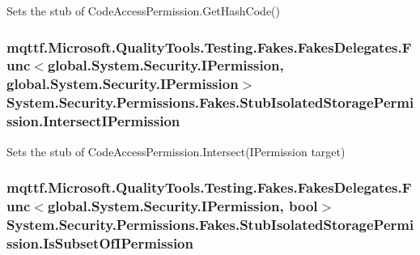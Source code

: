 Sets the stub of Code\-Access\-Permission.\-Get\-Hash\-Code()

\hypertarget{class_system_1_1_security_1_1_permissions_1_1_fakes_1_1_stub_isolated_storage_permission_a2d61c76240be9920724f92a256a30592}{
\subsubsection[{Intersect\-I\-Permission}]{\setlength{\rightskip}{0pt plus 5cm}mqttf.\-Microsoft.\-Quality\-Tools.\-Testing.\-Fakes.\-Fakes\-Delegates.\-Func$<$global.\-System.\-Security.\-I\-Permission, global.\-System.\-Security.\-I\-Permission$>$ System.\-Security.\-Permissions.\-Fakes.\-Stub\-Isolated\-Storage\-Permission.\-Intersect\-I\-Permission}}\label{class_system_1_1_security_1_1_permissions_1_1_fakes_1_1_stub_isolated_storage_permission_a2d61c76240be9920724f92a256a30592}


Sets the stub of Code\-Access\-Permission.\-Intersect(\-I\-Permission target)

\hypertarget{class_system_1_1_security_1_1_permissions_1_1_fakes_1_1_stub_isolated_storage_permission_a1bf5c6126563585f43c49fd7ae0e5b4e}{
\subsubsection[{Is\-Subset\-Of\-I\-Permission}]{\setlength{\rightskip}{0pt plus 5cm}mqttf.\-Microsoft.\-Quality\-Tools.\-Testing.\-Fakes.\-Fakes\-Delegates.\-Func$<$global.\-System.\-Security.\-I\-Permission, bool$>$ System.\-Security.\-Permissions.\-Fakes.\-Stub\-Isolated\-Storage\-Permission.\-Is\-Subset\-Of\-I\-Permission}}\label{class_system_1_1_security_1_1_permissions_1_1_fakes_1_1_stub_isolated_storage_permission_a1bf5c6126563585f43c49fd7ae0e5b4e}


